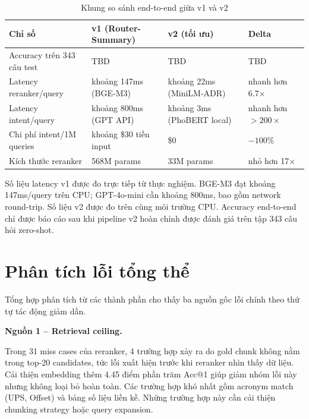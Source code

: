 \documentclass[../DoAn.tex]{subfiles}
\begin{document}
\begin{table}[H]
    \centering
    \caption{Khung so sánh end-to-end giữa v1 và v2}
    \label{tab:end-to-end-placeholder}
    {\small
    \setlength{\tabcolsep}{4pt}
    \begin{tabular}{|>{\raggedright\arraybackslash}p{4.5cm}|>{\centering\arraybackslash}p{3.4cm}|>{\centering\arraybackslash}p{3.4cm}|>{\centering\arraybackslash}p{2.2cm}|}
        \hline
        \textbf{Chỉ số} & \textbf{v1 (Router-Summary)} & \textbf{v2 (tối ưu)} & \textbf{Delta} \\ \hline
        Accuracy trên 343 câu test & TBD & TBD & TBD \\ \hline
        Latency reranker/query & khoảng 147ms (BGE-M3) & khoảng 22ms (MiniLM-ADR) & nhanh hơn 6.7$\times$ \\ \hline
        Latency intent/query & khoảng 800ms (GPT API) & khoảng 3ms (PhoBERT local) & nhanh hơn $>200\times$ \\ \hline
        Chi phí intent/1M queries & khoảng \$30 tiền input & \$0 & $-100\%$ \\ \hline
        Kích thước reranker & 568M params & 33M params & nhỏ hơn 17$\times$ \\ \hline
    \end{tabular}
    }
\end{table}

Số liệu latency v1 được đo trực tiếp từ thực nghiệm. BGE-M3 đạt khoảng 147ms/query trên CPU; GPT-4o-mini cần khoảng 800ms, bao gồm network round-trip. Số liệu v2 được đo trên cùng môi trường CPU. Accuracy end-to-end chỉ được báo cáo sau khi pipeline v2 hoàn chỉnh được đánh giá trên tập 343 câu hỏi zero-shot.

\section{Phân tích lỗi tổng thể}
\label{section:5.6}

Tổng hợp phân tích từ các thành phần cho thấy ba nguồn gốc lỗi chính theo thứ tự tác động giảm dần.

\noindent\textbf{Nguồn 1 -- Retrieval ceiling.}

Trong 31 miss cases của reranker, 4 trường hợp xảy ra do gold chunk không nằm trong top-20 candidates, tức lỗi xuất hiện trước khi reranker nhìn thấy dữ liệu. Cải thiện embedding thêm 4.45 điểm phần trăm Acc@1 giúp giảm nhóm lỗi này nhưng không loại bỏ hoàn toàn. Các trường hợp khó nhất gồm acronym match (UPS, Offset) và bảng số liệu liền kề. Những trường hợp này cần cải thiện chunking strategy hoặc query expansion.
\end{document}
